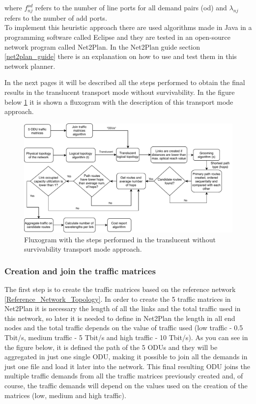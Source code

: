 \vspace{11pt}
\noindent
where $f_{nj}^{od}$ refers to the number of line ports for all demand pairs (od) and $\lambda_{nj}$ refers to the number of add ports.\\

\vspace{11pt}
To implement this heuristic approach there are used algorithms made in Java in a programming software called Eclipse and they are tested in an open-source network program called Net2Plan. In the Net2Plan guide section \ref{net2plan_guide} there is an explanation on how to use and test them in this network planner.

In the next pages it will be described all the steps performed to obtain the final results in the translucent transport mode without survivability. In the figure below \ref{fluxogram_transl_surv} it is shown a fluxogram with the description of this transport mode approach.

\begin{figure}[H]
\centering
\includegraphics[width=16cm]{sdf/heuristic/translucent_survivability/figures/fluxogram_translucent_surv}
\caption{Fluxogram with the steps performed in the translucent without survivability transport mode approach.}
\label{fluxogram_transl_surv}
\end{figure}

\newpage
\subsubsection{Creation and join the traffic matrices}

\noindent
The first step is to create the traffic matrices based on the reference network \ref{Reference_Network_Topology}. In order to create the 5 traffic matrices in Net2Plan it is necessary the length of all the links and the total traffic used in this network, so later it is needed to define in Net2Plan the length in all end nodes and the total traffic depends on the value of traffic used (low traffic - 0.5 Tbit/s, medium traffic - 5 Tbit/s and high traffic - 10 Tbit/s). As you can see in the figure below, it is defined the path of the 5 ODUs and they will be aggregated in just one single ODU, making it possible to join all the demands in just one file and load it later into the network. This final resulting ODU joins the multiple traffic demands from all the traffic matrices previously created and, of course, the traffic demands will depend on the values used on the creation of the matrices (low, medium and high traffic).

